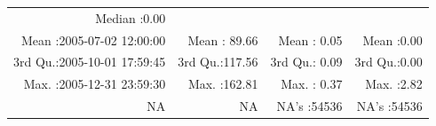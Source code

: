 \documentclass[
  10pt,
  a4paper,oneside]{article}
\begin{document}
\begin{longtable}[]{@{}rrrr@{}}
\begin{minipage}[t]{0.18\columnwidth}
Median :0.00\strut
\end{minipage}\tabularnewline
\begin{minipage}[t]{0.34\columnwidth}\raggedleft
Mean :2005-07-02 12:00:00\strut
\end{minipage} & \begin{minipage}[t]{0.19\columnwidth}\raggedleft
Mean : 89.66\strut
\end{minipage} & \begin{minipage}[t]{0.18\columnwidth}\raggedleft
Mean : 0.05\strut
\end{minipage} & \begin{minipage}[t]{0.18\columnwidth}\raggedleft
Mean :0.00\strut
\end{minipage}\tabularnewline
\begin{minipage}[t]{0.34\columnwidth}\raggedleft
3rd Qu.:2005-10-01 17:59:45\strut
\end{minipage} & \begin{minipage}[t]{0.19\columnwidth}\raggedleft
3rd Qu.:117.56\strut
\end{minipage} & \begin{minipage}[t]{0.18\columnwidth}\raggedleft
3rd Qu.: 0.09\strut
\end{minipage} & \begin{minipage}[t]{0.18\columnwidth}\raggedleft
3rd Qu.:0.00\strut
\end{minipage}\tabularnewline
\begin{minipage}[t]{0.34\columnwidth}\raggedleft
Max. :2005-12-31 23:59:30\strut
\end{minipage} & \begin{minipage}[t]{0.19\columnwidth}\raggedleft
Max. :162.81\strut
\end{minipage} & \begin{minipage}[t]{0.18\columnwidth}\raggedleft
Max. : 0.37\strut
\end{minipage} & \begin{minipage}[t]{0.18\columnwidth}\raggedleft
Max. :2.82\strut
\end{minipage}\tabularnewline
\begin{minipage}[t]{0.34\columnwidth}\raggedleft
NA\strut
\end{minipage} & \begin{minipage}[t]{0.19\columnwidth}\raggedleft
NA\strut
\end{minipage} & \begin{minipage}[t]{0.18\columnwidth}\raggedleft
NA's :54536\strut
\end{minipage} & \begin{minipage}[t]{0.18\columnwidth}\raggedleft
NA's :54536\strut
\end{minipage}\tabularnewline
\bottomrule
\end{longtable}
\end{document}
